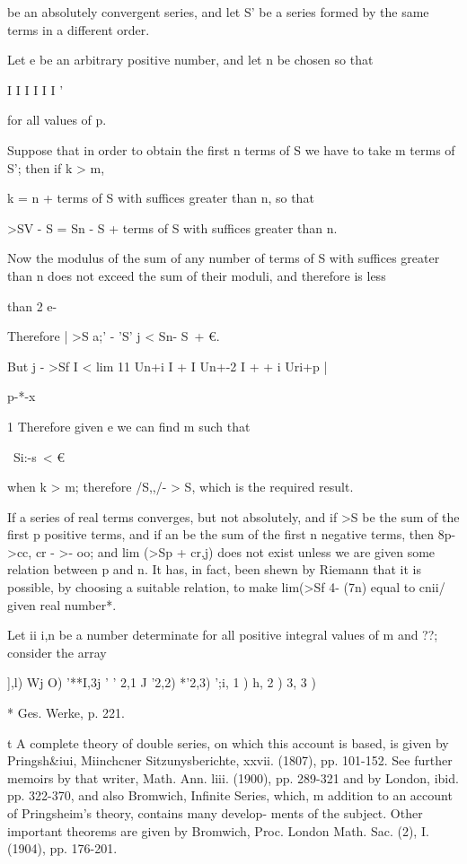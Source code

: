 %
%

be an absolutely convergent series, and let S' be a series formed by
the same terms in a different order.

Let e be an arbitrary positive number, and let n be chosen so that

I I I I I I '

for all values of p.

Suppose that in order to obtain the first n terms of S we have to take
m terms of S'; then if k > m,

 k = n + terms of S with suffices greater than n, so that

>SV - S = Sn - S + terms of S with suffices greater than n.

Now the modulus of the sum of any number of terms of S with suffices
greater than n does not exceed the sum of their moduli, and therefore
is less

than 2 e-

Therefore | >S a;' - 'S' j < Sn- S\ + €.

But j - >Sf I < lim 11 Un+i I + I Un+-2 I +    + i Uri+p |

p-*-x

1 Therefore given e we can find m such that

\ Si:-s\ < €

when k > m; therefore /S,,/- > S, which is the required result.

If a series of real terms converges, but not absolutely, and if >S be
the sum of the first p positive terms, and if an be the sum of the
first n negative terms, then 8p->cc, cr - >- oo; and lim (>Sp + cr,j)
does not exist unless we are given some relation between p and n. It
has, in fact, been shewn by Riemann that it is possible, by choosing a
suitable relation, to make lim(>Sf 4- (7n) equal to cnii/ given real
number*.


Let ii i,n be a number determinate for all positive integral values of
m and ??; consider the array

 ],l) Wj O) '**I,3j  ' ' 2,1 J '2,2) *'2,3)   ';i, 1 ) h, 2 ) 3,
3 )   

* Ges. Werke, p. 221.

t A complete theory of double series, on which this account is based,
is given by Pringsh\&iui, Miinchcner Sitzunysberichte, xxvii. (1807),
pp. 101-152. See further memoirs by that writer, Math. Ann. liii.
(1900), pp. 289-321 and by London, ibid. pp. 322-370, and also
Bromwich, Infinite Series, which, m addition to an account of
Pringsheim's theory, contains many develop- ments of the subject.
Other important theorems are given by Bromwich, Proc. London Math.
Sac. (2), I. (1904), pp. 176-201.

